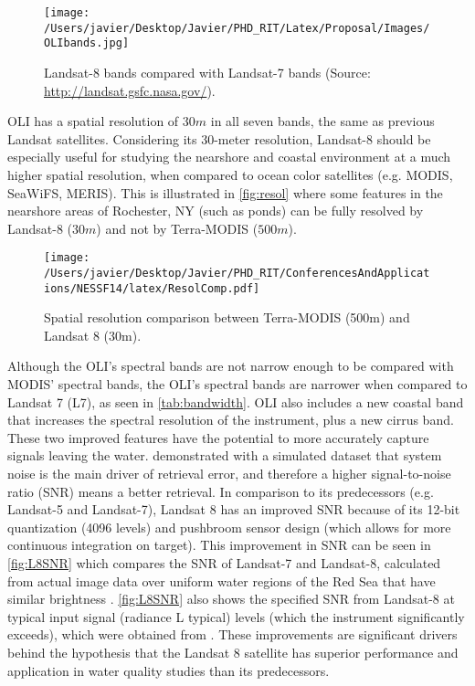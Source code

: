 \begin{figure}[htb]
\centering
      \texttt{[image: /Users/javier/Desktop/Javier/PHD\_RIT/Latex/Proposal/Images/OLIbands.jpg]}
      \caption{Landsat-8 bands compared with Landsat-7 bands (Source: \protect\url{http://landsat.gsfc.nasa.gov/}).}
      \label{fig:olibands}
\end{figure}

OLI has a spatial resolution of $30m$ in all seven bands, the same as previous Landsat satellites. Considering its 30-meter resolution, Landsat-8 should be especially useful for studying the nearshore and coastal environment at a much higher spatial resolution, when compared to ocean color satellites (e.g. MODIS, SeaWiFS, MERIS). This is illustrated in \autoref{fig:resol} where some features in the nearshore areas of Rochester, NY (such as ponds) can be fully resolved by Landsat-8 ($30m$) and not by Terra-MODIS ($500m$).

\begin{figure}[htb]
  \centering
  \texttt{[image: /Users/javier/Desktop/Javier/PHD\_RIT/ConferencesAndApplications/NESSF14/latex/ResolComp.pdf]}
  \caption{Spatial resolution comparison between Terra-MODIS (500m) and Landsat 8 (30m). \label{fig:resol} } 
\end{figure}

Although the OLI's spectral bands are not narrow enough to be compared with MODIS' spectral bands, the OLI's spectral bands are narrower when compared to Landsat 7 (L7), as seen in \autoref{tab:bandwidth}. OLI also includes a new coastal band that increases the spectral resolution of the instrument, plus a new cirrus band. These two improved features have the potential to more accurately capture signals leaving the water. \cite{Gerace:2013} demonstrated with a simulated dataset that system noise is the main driver of retrieval error, and therefore a higher signal-to-noise ratio (SNR) means a better retrieval. In comparison to its predecessors (e.g. Landsat-5 and Landsat-7), Landsat 8 has an improved SNR because of its 12-bit quantization (4096 levels) and pushbroom sensor design (which allows for more continuous integration on target). This improvement in SNR can be seen in \autoref{fig:L8SNR} which compares the SNR of Landsat-7 and Landsat-8, calculated from actual image data over uniform water regions of the Red Sea that have similar brightness \cite{Hu:2012}. \autoref{fig:L8SNR} also shows the specified SNR from Landsat-8 at typical input signal (radiance L typical) levels (which the instrument significantly exceeds), which were obtained from \cite{Irons:2012}. These improvements are significant drivers behind the hypothesis that the Landsat 8 satellite has superior performance and application in water quality studies than its predecessors.


